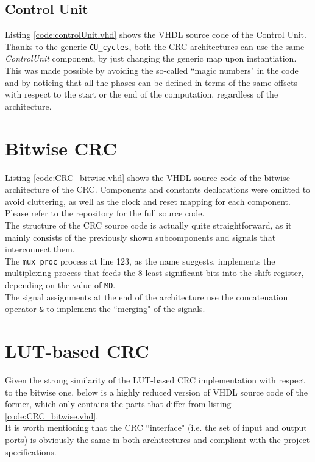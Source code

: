 \subsection{Control Unit}\label{subsec:controlUnit.vhd}
\lstset{style=codestyle}\label{code:controlUnit.vhd}

Listing \ref{code:controlUnit.vhd} shows the VHDL source code of the Control Unit.\\
Thanks to the generic \texttt{CU\_cycles}, both the CRC architectures can use the same \textit{ControlUnit} component, by just changing the generic map upon instantiation.\\
This was made possible by avoiding the so-called ``magic numbers" in the code and by noticing that all the phases can be defined in terms of the same offsets with respect to the start or the end of the computation, regardless of the architecture.
\pagebreak

\section{Bitwise CRC}\label{sec:CRCbitwise.vhd}
\lstset{style=codestyle}\label{code:CRC_bitwise.vhd}

\hfill \break
Listing \ref{code:CRC_bitwise.vhd} shows the VHDL source code of the bitwise architecture of the CRC. Components and constants declarations were omitted to avoid cluttering, as well as the clock and reset mapping for each component. Please refer to the repository for the full source code.\\
The structure of the CRC source code is actually quite straightforward, as it mainly consists of the previously shown subcomponents and signals that interconnect them.\\
The \texttt{mux\_proc} process at line 123, as the name suggests, implements the multiplexing process that feeds the 8 least significant bits into the shift register, depending on the value of \texttt{MD}.\\
The signal assignments at the end of the architecture use the concatenation operator \texttt{\&} to implement the ``merging" of the signals.

\section{LUT-based CRC}\label{sec:CRC_LUT.vhd}
Given the strong similarity of the LUT-based CRC implementation with respect to the bitwise one, below is a highly reduced version of VHDL source code of the former, which only contains the parts that differ from listing \ref{code:CRC_bitwise.vhd}.\\
It is worth mentioning that the CRC ``interface" (i.e. the set of input and output ports) is obviously the same in both architectures and compliant with the project specifications.

